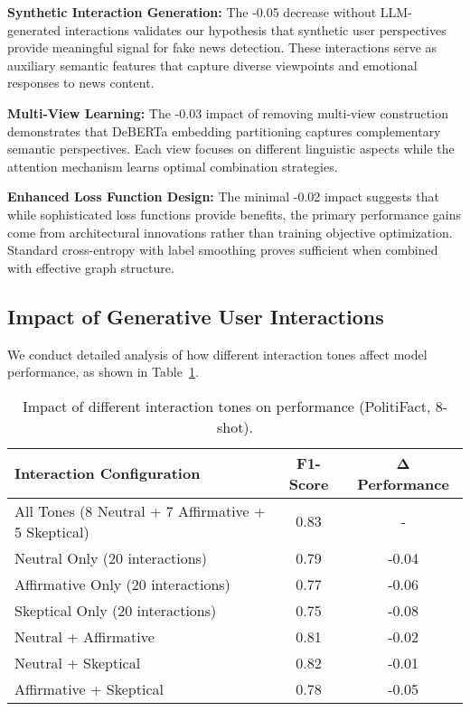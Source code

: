 \textbf{Synthetic Interaction Generation:} The -0.05 decrease without LLM-generated interactions validates our hypothesis that synthetic user perspectives provide meaningful signal for fake news detection. These interactions serve as auxiliary semantic features that capture diverse viewpoints and emotional responses to news content.

\textbf{Multi-View Learning:} The -0.03 impact of removing multi-view construction demonstrates that DeBERTa embedding partitioning captures complementary semantic perspectives. Each view focuses on different linguistic aspects while the attention mechanism learns optimal combination strategies.

\textbf{Enhanced Loss Function Design:} The minimal -0.02 impact suggests that while sophisticated loss functions provide benefits, the primary performance gains come from architectural innovations rather than training objective optimization. Standard cross-entropy with label smoothing proves sufficient when combined with effective graph structure.

\subsection{Impact of Generative User Interactions}

We conduct detailed analysis of how different interaction tones affect model performance, as shown in Table~\ref{tab:ablation:tones}.

\begin{table}[htbp]
\centering
\caption{Impact of different interaction tones on performance (PolitiFact, 8-shot).}
\label{tab:ablation:tones}
\begin{tabular}{lcc}
\toprule
\textbf{Interaction Configuration} & \textbf{F1-Score} & \textbf{Δ Performance} \\
\midrule
All Tones (8 Neutral + 7 Affirmative + 5 Skeptical) & 0.83 & - \\
\midrule
Neutral Only (20 interactions) & 0.79 & -0.04 \\
Affirmative Only (20 interactions) & 0.77 & -0.06 \\
Skeptical Only (20 interactions) & 0.75 & -0.08 \\
\midrule
Neutral + Affirmative & 0.81 & -0.02 \\
Neutral + Skeptical & 0.82 & -0.01 \\
Affirmative + Skeptical & 0.78 & -0.05 \\
\bottomrule
\end{tabular}
\end{table}

